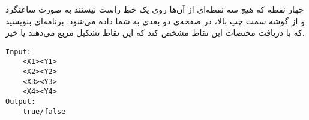 
چهار نقطه که هیچ سه نقطه‌ای از آن‌ها روی یک خط راست نیستند به صورت ساعتگرد و از گوشه سمت چپ بالا، در صفحه‌ی دو بعدی به شما داده می‌شود.
برنامه‌ای بنویسید که با دریافت مختصات این نقاط مشخص کند که این نقاط تشکیل مربع می‌دهند یا خیر.

\begin{latin}
\begin{verbatim}
Input:
    <X1><Y1>
    <X2><Y2>
    <X3><Y3>
    <X4><Y4>
Output:
    true/false
\end{verbatim}
\end{latin}

